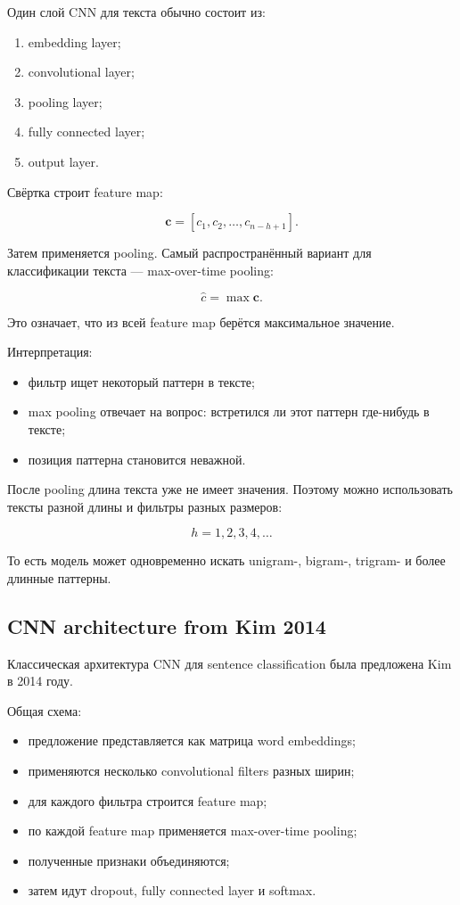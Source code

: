 \documentclass[a4paper,12pt]{article}
\begin{document}
Один слой CNN для текста обычно состоит из:

\begin{enumerate}
    \item embedding layer;
    \item convolutional layer;
    \item pooling layer;
    \item fully connected layer;
    \item output layer.
\end{enumerate}

Свёртка строит feature map:

\[
\bm{c}
=
[c_1, c_2, \dots, c_{n-h+1}].
\]

Затем применяется pooling. Самый распространённый вариант для классификации текста --- max-over-time pooling:

\[
\hat{c}
=
\max \bm{c}.
\]

Это означает, что из всей feature map берётся максимальное значение.

Интерпретация:

\begin{itemize}
    \item фильтр ищет некоторый паттерн в тексте;
    \item max pooling отвечает на вопрос: встретился ли этот паттерн где-нибудь в тексте;
    \item позиция паттерна становится неважной.
\end{itemize}

После pooling длина текста уже не имеет значения. Поэтому можно использовать тексты разной длины и фильтры разных размеров:

\[
h = 1, 2, 3, 4, \dots
\]

То есть модель может одновременно искать unigram-, bigram-, trigram- и более длинные паттерны.



\subsection{CNN architecture from Kim 2014}

Классическая архитектура CNN для sentence classification была предложена Kim в 2014 году.

Общая схема:

\begin{itemize}
    \item предложение представляется как матрица word embeddings;
    \item применяются несколько convolutional filters разных ширин;
    \item для каждого фильтра строится feature map;
    \item по каждой feature map применяется max-over-time pooling;
    \item полученные признаки объединяются;
    \item затем идут dropout, fully connected layer и softmax.
\end{itemize}
\end{document}
